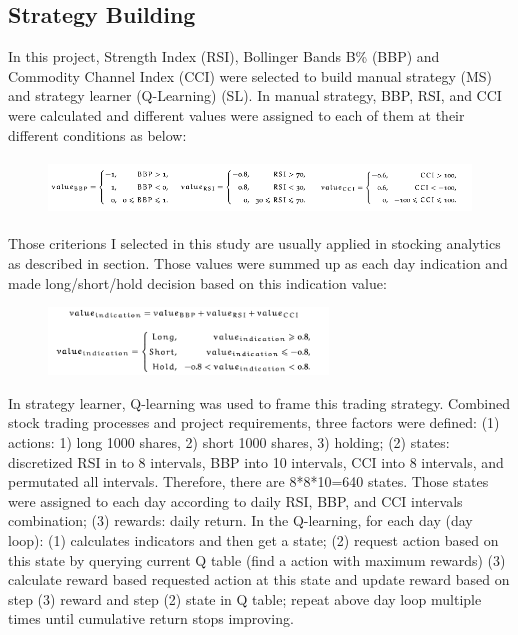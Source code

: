 \documentclass{amia}
\begin{document}
\subsection*{Strategy Building}
In this project, Strength Index (RSI), Bollinger Bands B\% (BBP) and Commodity Channel Index (CCI) were selected to build manual strategy (MS) and strategy learner (Q-Learning) (SL). 
In manual strategy, BBP, RSI, and CCI were calculated and different values were assigned to each of them at their different conditions as below:
\vspace{-3mm}
\begin{figure}[H]
	\centering
	\includegraphics[height=1.5cm]{pics/ms_val.png}
\end{figure}
\vspace{-5mm}
Those criterions I selected in this study are usually applied in stocking analytics as described in section. Those values were summed up as each day indication and made long/short/hold decision based on this indication value:
\vspace{-3mm}
\begin{figure}[H]
	\centering
	\includegraphics[height=1.8cm]{pics/ms_formula.png}
\end{figure}
\vspace{-5mm}
In strategy learner, Q-learning was used to frame this trading strategy. Combined stock trading processes and project requirements, three factors were defined: (1) actions: 1) long 1000 shares, 2) short 1000 shares, 3) holding; (2) states: discretized RSI in to 8 intervals, BBP into 10 intervals, CCI into 8 intervals, and permutated all intervals. Therefore, there are 8*8*10=640 states. Those states were assigned to each day according to daily RSI, BBP, and CCI intervals combination; (3) rewards: daily return. In the Q-learning, for each day (day loop): (1) calculates indicators and then get a state; (2) request action based on this state by querying current Q table (find a action with maximum rewards) (3) calculate reward based requested action at this state and update reward based on step (3) reward and step (2) state in Q table; repeat above day loop multiple times until cumulative return stops improving. 
\end{document}
